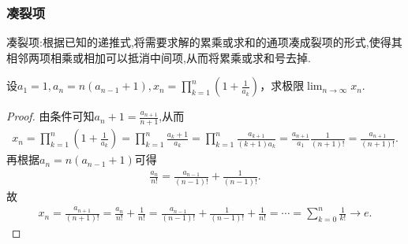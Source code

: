 \documentclass[../../main.tex]{subfiles}%
\begin{document}
\subsubsection{凑裂项}

凑裂项:根据已知的递推式,将需要求解的累乘或求和的通项凑成裂项的形式,使得其相邻两项相乘或相加可以抵消中间项,从而将累乘或求和号去掉.

\begin{example}
设\(a_1 = 1,a_n = n(a_{n - 1}+1),x_n=\prod_{k = 1}^{n}\left(1+\frac{1}{a_k}\right)\)，求极限\(\lim_{n\rightarrow\infty}x_n\).
\end{example}
\begin{proof}

由条件可知$a_n+1=\frac{a_{n+1}}{n+1}$,从而
\begin{align*}
x_n=\prod_{k=1}^n{\left( 1+\frac{1}{a_k} \right)}=\prod_{k=1}^n{\frac{a_k+1}{a_k}}=\prod_{k=1}^n{\frac{a_{k+1}}{(k+1)a_k}}=\frac{a_{n+1}}{a_1}\frac{1}{(n+1)!}=\frac{a_{n+1}}{(n+1)!}.
\end{align*}
再根据$a_n=n(a_{n-1}+1)$可得
\begin{align*}
\frac{a_n}{n!}=\frac{a_{n-1}}{(n-1)!}+\frac{1}{(n-1)!}.
\end{align*}
故
\begin{align*}
x_n=\frac{a_{n+1}}{(n+1)!}=\frac{a_n}{n!}+\frac{1}{n!}=\frac{a_{n-1}}{(n-1)!}+\frac{1}{(n-1)!}+\frac{1}{n!}=\cdots =\sum_{k=0}^n{\frac{1}{k!}\rightarrow e.}
\end{align*}

\end{proof}
\end{document}
